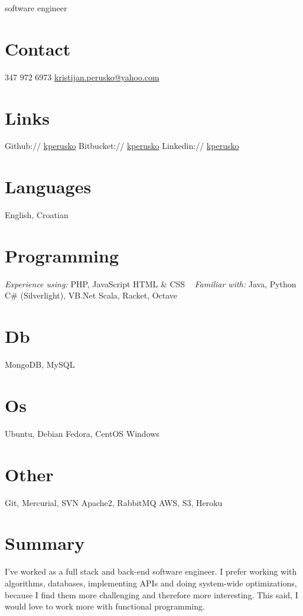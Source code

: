 \documentclass[]{cv}
\begin{document}
       {software engineer}
       
\begin{aside}
  \section{Contact}
    347 972 6973
    \href{mailto:kristijan.perusko@yahoo.com}{kristijan.perusko@yahoo.com}  
  \section{Links}  
    Github:// \href{https://github.com/kperusko}{kperusko}
    Bitbucket:// \href{https://bitbucket.org/kperusko}{kperusko}
    Linkedin:// \href{https://www.linkedin.com/in/kperusko}{kperusko}
  \section{Languages}
    English, Croatian
  \section{Programming}
    \emph{Experience using:}
    PHP, JavaScript
    HTML \& CSS
~     
    \emph{Familiar with:}
    Java, Python
    C\# (Silverlight), VB.Net
    Scala, Racket, Octave
  \section{Db}
    MongoDB, MySQL
  \section{Os}
    Ubuntu, Debian 
    Fedora, CentOS
    Windows
  \section{Other}
    Git, Mercurial, SVN
    Apache2, RabbitMQ
    AWS, S3, Heroku
\end{aside}

\section{Summary}
I've worked as a full stack and back-end software engineer. I prefer working with algorithms, databases, implementing APIs and doing system-wide optimizations, because I find them more challenging and therefore more interesting. This said, I would love to work more with functional programming.
\end{document}
